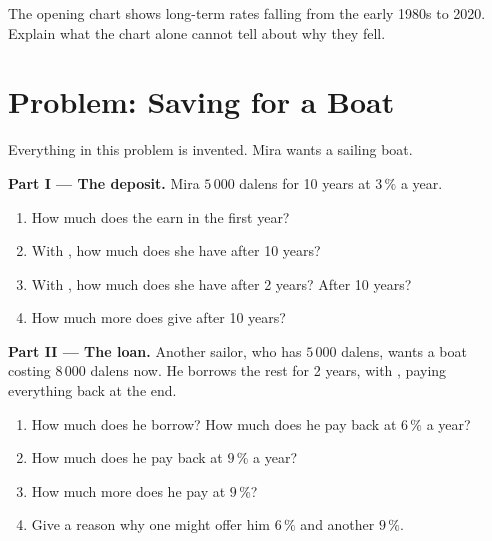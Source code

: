\begin{exercise}[$\star\star\star$]\label{exo:g8:banks-saving-interest:12}
The opening chart shows long-term rates falling from the early 1980s to 2020. Explain what the chart
alone cannot tell about why they fell.
\end{exercise}

\section{Problem: Saving for a Boat}

\begin{problem}
\label{pb:g8:banks-saving-interest:1}
Everything in this problem is invented. Mira wants a sailing boat.

\medskip
\noindent\textbf{Part I --- The deposit.} Mira  $5\,000$ dalens for 10 years at $3\,\%$ a
year.
\begin{enumerate}
  \item How much  does the  earn in the first year?
  \item With , how much does she have after 10 years?
  \item With , how much does she have after 2 years? After 10 years?
  \item How much more does  give after 10 years?
\end{enumerate}

\medskip
\noindent\textbf{Part II --- The loan.} Another sailor, who has $5\,000$ dalens, wants a boat costing
$8\,000$ dalens now. He borrows the rest for 2 years, with , paying everything back
at the end.
\begin{enumerate}[resume]
  \item How much does he borrow? How much does he pay back at $6\,\%$ a year?
  \item How much does he pay back at $9\,\%$ a year?
  \item How much more  does he pay at $9\,\%$?
  \item Give a reason why one  might offer him $6\,\%$ and another $9\,\%$.
\end{enumerate}


\end{problem}

